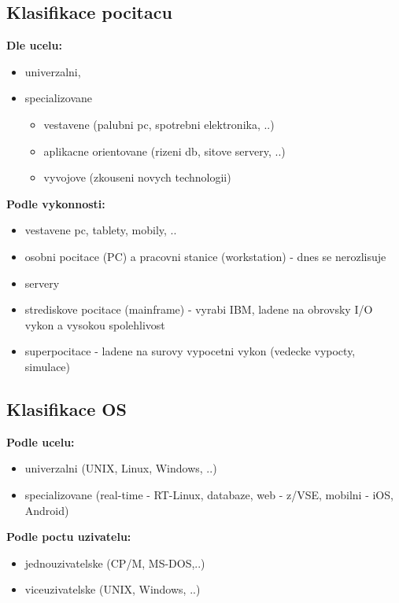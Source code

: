\documentclass[a4paper, 11pt]{article}
\begin{document}
\subsection{Klasifikace pocitacu}

\noindent\textbf{Dle ucelu:}
\begin{itemize}
    \item univerzalni,
    \item specializovane
    \begin{itemize}
        \item vestavene (palubni pc, spotrebni elektronika, ..)
        \item aplikacne orientovane (rizeni db, sitove servery, ..)
        \item vyvojove (zkouseni novych technologii) \\
    \end{itemize}
\end{itemize}

\noindent\textbf{Podle vykonnosti:}
\begin{itemize}
    \item vestavene pc, tablety, mobily, ..
    \item osobni pocitace (PC) a pracovni stanice (workstation) - dnes se nerozlisuje
    \item servery
    \item strediskove pocitace (mainframe) - vyrabi IBM, ladene na obrovsky I/O vykon a vysokou spolehlivost
    \item superpocitace - ladene na surovy vypocetni vykon (vedecke vypocty, simulace) \\
\end{itemize}

\newpage

\subsection{Klasifikace OS}

\noindent\textbf{Podle ucelu:}
\begin{itemize}
    \item univerzalni (UNIX, Linux, Windows, ..)
    \item specializovane (real-time - RT-Linux, databaze, web - z/VSE, mobilni - iOS, Android) \\
\end{itemize}

\noindent\textbf{Podle poctu uzivatelu:}
\begin{itemize}
    \item jednouzivatelske (CP/M, MS-DOS,..)
    \item viceuzivatelske (UNIX, Windows, ..) \\
\end{itemize}
\end{document}
